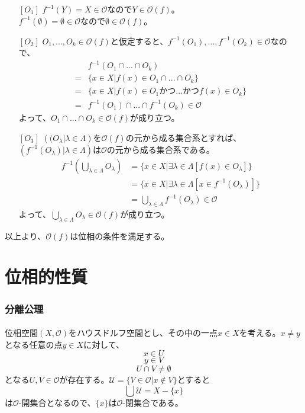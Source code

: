 \documentclass{jsarticle}
\begin{document}
\begin{enumerate}
\item[{$[O_1]$}]
$f^{-1}(Y)=X\in\mathcal{O}$なので$Y\in\mathcal{O}(f)$。\\
$f^{-1}(\emptyset)=\emptyset\in\mathcal{O}$なので$\emptyset\in\mathcal{O}(f)$。
\item[{$[O_2]$}]
$O_1,...,O_k\in\mathcal{O}(f)$と仮定すると、$f^{-1}(O_1),...,f^{-1}(O_k)\in\mathcal{O}$なので、
\begin{align*}
&f^{-1}(O_1\cap...\cap O_k)\\
=&\{x\in X|f(x)\in O_1\cap...\cap O_k\}\\
=&\{x\in X| f(x)\in O_1 かつ...かつ f(x)\in O_k\}\\
=& f^{-1}(O_1)\cap...\cap f^{-1}(O_k)\in\mathcal{O}
\end{align*}
よって、$O_1\cap...\cap O_k\in\mathcal{O}(f)$が成り立つ。
\item[{$[O_3]$}]
$(\mathcal(O_\lambda|\lambda\in\Lambda)$を$\mathcal{O}(f)$の元から成る集合系とすれば、$(f^{-1}(O_\lambda)|\lambda\in\Lambda)$は$\mathcal{O}$の元から成る集合系である。
\begin{align*}
f^{-1}(\bigcup_{\lambda\in\Lambda}O_\lambda)&=\{x\in X|\exists\lambda\in\Lambda[f(x)\in O_\lambda]\}\\
&=\{x\in X|\exists\lambda\in\Lambda[x\in f^{-1}(O_\lambda)]\}\\
&=\bigcup_{\lambda\in\Lambda}f^{-1}(O_\lambda)\in\mathcal{O}
\end{align*}
よって、$\bigcup_{\lambda\in\Lambda}O_\lambda\in\mathcal{O}(f)$が成り立つ。
\end{enumerate}
以上より、$\mathcal{O}(f)$は位相の条件を満足する。











\part{位相的性質}
\section{分離公理}
\subsection{}
位相空間$(X,\mathcal{O})$をハウスドルフ空間とし、その中の一点$x\in X$を考える。$x\neq y$となる任意の点$y\in X$に対して、
\[x\in U\]
\[y\in V\]
\[U\cap V\neq\emptyset\]
となる$U,V\in \mathcal{O}$が存在する。$\mathcal{U}=\{V\in\mathcal{O}|x\notin V\}$とすると
\[\bigcup\mathcal{U}=X-\{x\}\]
は$\mathcal{O}$-開集合となるので、$\{x\}$は$\mathcal{O}$-閉集合である。
\end{document}
